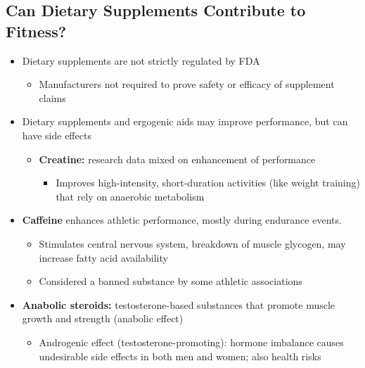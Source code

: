 \documentclass[12pt]{article}
\begin{document}
        \subsection{Can Dietary Supplements Contribute to Fitness?}
            \begin{itemize}
                \item Dietary supplements are not strictly regulated by FDA
                    \begin{itemize}
                        \item Manufacturers not required to prove safety or efficacy of supplement claims
                    \end{itemize}
                \item Dietary supplements and ergogenic aids may improve performance, but can have side effects
                    \begin{itemize}
                        \item \textbf{Creatine:} research data mixed on enhancement of performance
                            \begin{itemize}
                                \item Improves high-intensity, short-duration activities (like weight training) that rely on anaerobic metabolism
                            \end{itemize}
                    \end{itemize}
                \item \textbf{Caffeine} enhances athletic performance, mostly during endurance events.
                    \begin{itemize}
                        \item Stimulates central nervous system, breakdown of muscle glycogen, may increase fatty acid availability
                        \item Considered a banned substance by some athletic associations
                    \end{itemize}
                \item \textbf{Anabolic steroids:} testosterone-based substances that promote muscle growth and strength (anabolic effect)
                    \begin{itemize}
                        \item Androgenic effect (testosterone-promoting): hormone imbalance causes undesirable side effects in both men and women; also health risks
                    \end{itemize}

\end{itemize}
\end{document}
